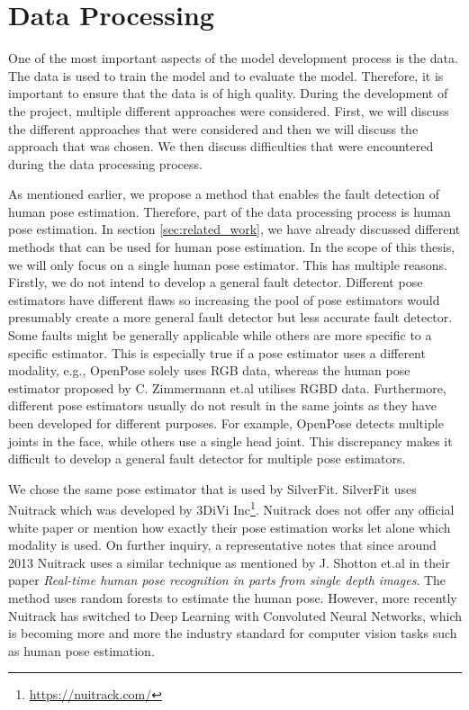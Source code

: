 \chapter{Data Processing}
\label{sec:data_processing}

One of the most important aspects of the model development process is the data. The data is used to train the model and to evaluate the model. Therefore, it is important to ensure that the data is of high quality. During the development of the project, multiple different approaches were considered. First, we will discuss the different approaches that were considered and then we will discuss the approach that was chosen. We then discuss difficulties that were encountered during the data processing process.

As mentioned earlier, we propose a method that enables the fault detection of human pose estimation. Therefore, part of the data processing process is human pose estimation. In section \ref{sec:related_work}, we have already discussed different methods that can be used for human pose estimation. In the scope of this thesis, we will only focus on a single human pose estimator. This has multiple reasons. Firstly, we do not intend to develop a general fault detector. Different pose estimators have different flaws so increasing the pool of pose estimators would presumably create a more general fault detector but less accurate fault detector. Some faults might be generally applicable while others are more specific to a specific estimator. This is especially true if a pose estimator uses a different modality, e.g., OpenPose solely uses RGB data, whereas the human pose estimator proposed by C. Zimmermann et.al utilises RGBD data\cite{OpenPosePose, RGBDHPEforRoboticTaskLearning}. Furthermore, different pose estimators usually do not result in the same joints as they have been developed for different purposes. For example, OpenPose detects multiple joints in the face, while others use a single head joint. This discrepancy makes it difficult to develop a general fault detector for multiple pose estimators. 

We chose the same pose estimator that is used by SilverFit. SilverFit uses Nuitrack which was developed by 3DiVi Inc\footnote{\url{https://nuitrack.com/}}. Nuitrack does not offer any official white paper or mention how exactly their pose estimation works let alone which modality is used. On further inquiry, a representative notes that since around 2013 Nuitrack uses a similar technique as mentioned by J. Shotton et.al in their paper \textit{Real-time human pose recognition in parts from single depth images}\cite{EarlyRGBDHPE}. The method uses random forests to estimate the human pose. However, more recently Nuitrack has switched to Deep Learning with Convoluted Neural Networks, which is becoming more and more the industry standard for computer vision tasks such as human pose estimation.





